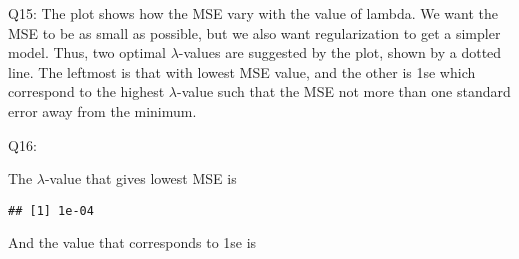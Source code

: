 \documentclass[]{article}
\newenvironment{Shaded}{\begin{snugshade}}{\end{snugshade}}
\newcommand{\KeywordTok}[1]{\textcolor[rgb]{0.13,0.29,0.53}{\textbf{#1}}}
\newcommand{\DataTypeTok}[1]{\textcolor[rgb]{0.13,0.29,0.53}{#1}}
\newcommand{\DecValTok}[1]{\textcolor[rgb]{0.00,0.00,0.81}{#1}}
\newcommand{\FloatTok}[1]{\textcolor[rgb]{0.00,0.00,0.81}{#1}}
\newcommand{\StringTok}[1]{\textcolor[rgb]{0.31,0.60,0.02}{#1}}
\newcommand{\CommentTok}[1]{\textcolor[rgb]{0.56,0.35,0.01}{\textit{#1}}}
\newcommand{\OtherTok}[1]{\textcolor[rgb]{0.56,0.35,0.01}{#1}}
\newcommand{\OperatorTok}[1]{\textcolor[rgb]{0.81,0.36,0.00}{\textbf{#1}}}
\newcommand{\NormalTok}[1]{#1}
\begin{document}
Q15: The plot shows how the MSE vary with the value of lambda. We want
the MSE to be as small as possible, but we also want regularization to
get a simpler model. Thus, two optimal \(\lambda\)-values are suggested
by the plot, shown by a dotted line. The leftmost is that with lowest
MSE value, and the other is 1se which correspond to the highest
\(\lambda\)-value such that the MSE not more than one standard error
away from the minimum.

Q16:

\begin{Shaded}
\end{Shaded}

The \(\lambda\)-value that gives lowest MSE is

\begin{Shaded}
\end{Shaded}

\begin{verbatim}
## [1] 1e-04
\end{verbatim}

And the value that corresponds to 1se is

\begin{Shaded}
\end{Shaded}
\end{document}
